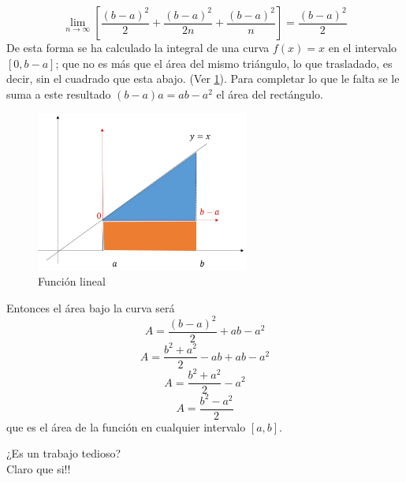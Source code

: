 \documentclass[10pt,twoside]{SelfArx} %
\begin{document}
\begin{ejemplo}
\begin{equation}
\lim\limits_{n\rightarrow\infty}\left [\dfrac{(b-a)^{2}}{2}+\dfrac{(b-a)^{2}}{2n}+\dfrac{(b-a)^{2}}{n}\right ]=\dfrac{(b-a)^{2}}{2}
\end{equation}
De esta forma se ha calculado la integral de una curva $ f(x)=x $ en  el intervalo $ [0,b-a] $; que no es más que el área del mismo triángulo, lo que trasladado, es decir, sin el cuadrado que esta abajo. (Ver \ref{integracion6}). Para completar lo que le falta se le suma a este resultado $ (b-a)a=ab-a^{2} $ el área del rectángulo.
    \begin{figure}[h]
    	\centering
    	\includegraphics[width=7cm]{integracion6}
    	\caption{Función lineal}
    	\label{integracion6}
    \end{figure}
 Entonces el área bajo la curva será 
 \begin{equation}
 A=\dfrac{(b-a)^{2}}{2}+ab-a^{2}
 \end{equation} 
 \begin{equation}
 A=\dfrac{b^{2}+a^{2}}{2}-ab+ab-a^{2}
 \end{equation}   
\begin{equation}
 A=\dfrac{b^{2}+a^{2}}{2}-a^{2}
\end{equation}    
\begin{equation}
 A=\dfrac{b^{2}-a^{2}}{2}
\end{equation}
que es el área de la función en cualquier intervalo $ [a,b] $.\\

\end{ejemplo}
¿Es un trabajo tedioso? \\
Claro que si!!\\
\end{document}
